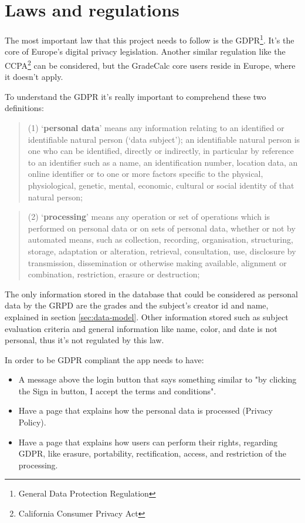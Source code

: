 \clearpage\newpage
\section{Laws and regulations}
\label{sec:laws}


The most important law that this project needs to follow is the GDPR\footnote{General Data Protection Regulation}\cite{gdpr}. It's the core of Europe's digital privacy legislation. 
Another similar regulation like the CCPA\footnote{California Consumer Privacy Act} can be considered, but the GradeCalc core users reside in Europe, where it doesn't apply.

To understand the GDPR it's really important to comprehend these two definitions\cite{gdpr-definitions}:
\begin{quote}
(1) ‘\textbf{personal data}’ means any information relating to an identified or identifiable natural person (‘data subject’); an identifiable natural person is one who can be identified, directly or indirectly, in particular by reference to an identifier such as a name, an identification number, location data, an online identifier or to one or more factors specific to the physical, physiological, genetic, mental, economic, cultural or social identity of that natural person;
\end{quote}

\begin{quote}
(2) ‘\textbf{processing}’ means any operation or set of operations which is performed on personal data or on sets of personal data, whether or not by automated means, such as collection, recording, organisation, structuring, storage, adaptation or alteration, retrieval, consultation, use, disclosure by transmission, dissemination or otherwise making available, alignment or combination, restriction, erasure or destruction;
\end{quote}

The only information stored in the database that could be considered as personal data by the GRPD\cite{gdpr} are the grades and the subject's creator id and name, explained in section \ref{sec:data-model}. Other information stored such as subject evaluation criteria and general information like name, color, and date is not personal, thus it's not regulated by this law.

In order to be GDPR compliant the app needs to have:
\begin{itemize}
    \item A message above the login button that says something similar to "by clicking the Sign in button, I accept the terms and conditions".
    \item Have a page that explains how the personal data is processed (Privacy Policy).
    \item Have a page that explains how users can perform their rights, regarding GDPR, like erasure, portability, rectification, access, and restriction of the processing.
\end{itemize}

